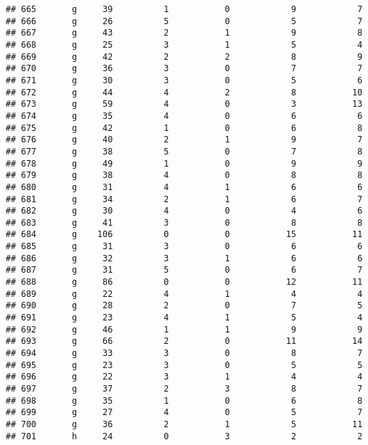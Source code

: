 \documentclass[
]{article}
\begin{document}
\begin{verbatim}
## 665       g     39          1           0            9            7
## 666       g     26          5           0            5            7
## 667       g     43          2           1            9            8
## 668       g     25          3           1            5            4
## 669       g     42          2           2            8            9
## 670       g     36          3           0            7            7
## 671       g     30          3           0            5            6
## 672       g     44          4           2            8           10
## 673       g     59          4           0            3           13
## 674       g     35          4           0            6            6
## 675       g     42          1           0            6            8
## 676       g     40          2           1            9            7
## 677       g     38          5           0            7            8
## 678       g     49          1           0            9            9
## 679       g     38          4           0            8            8
## 680       g     31          4           1            6            6
## 681       g     34          2           1            6            7
## 682       g     30          4           0            4            6
## 683       g     41          3           0            8            8
## 684       g    106          0           0           15           11
## 685       g     31          3           0            6            6
## 686       g     32          3           1            6            6
## 687       g     31          5           0            6            7
## 688       g     86          0           0           12           11
## 689       g     22          4           1            4            4
## 690       g     28          2           0            7            5
## 691       g     23          4           1            5            4
## 692       g     46          1           1            9            9
## 693       g     66          2           0           11           14
## 694       g     33          3           0            8            7
## 695       g     23          3           0            5            5
## 696       g     22          3           1            4            4
## 697       g     37          2           3            8            7
## 698       g     35          1           0            6            8
## 699       g     27          4           0            5            7
## 700       g     36          2           1            5           11
## 701       h     24          0           3            2            2

\end{verbatim}
\end{document}
